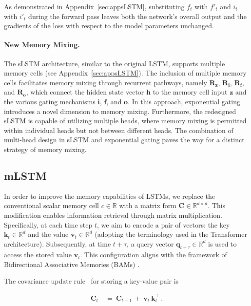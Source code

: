As demonstrated in Appendix~\ref{sec:appsLSTM}, substituting $f_t$ with $f'_t$ and $i_t$ with $i'_t$ during the forward pass leaves both the network’s overall output and the gradients of the loss with respect to the model parameters unchanged.

\paragraph{New Memory Mixing.} The sLSTM architecture, similar to the original LSTM, supports multiple memory cells (see Appendix~\ref{sec:appsLSTM}). The inclusion of multiple memory cells facilitates memory mixing through recurrent pathways, namely $\mathbf{R}_{\mathbf{z}}$, $\mathbf{R}_{\mathbf{i}}$, $\mathbf{R}_{\mathbf{f}}$, and $\mathbf{R}_{\mathbf{o}}$, which connect the hidden state vector $\mathbf{h}$ to the memory cell input $\mathbf{z}$ and the various gating mechanisms $\mathbf{i}$, $\mathbf{f}$, and $\mathbf{o}$. In this approach, exponential gating introduces a novel dimension to memory mixing. Furthermore, the redesigned sLSTM is capable of utilizing multiple heads, where memory mixing is permitted within individual heads but not between different heads. The combination of multi-head design in sLSTM and exponential gating paves the way for a distinct strategy of memory mixing.

\subsection{mLSTM}
\label{sec:mLSTM}

In order to improve the memory capabilities of LSTMs, we replace the conventional scalar memory cell $c \in \mathbb{R}$ with a matrix form $\mathbf{C} \in \mathbb{R}^{d \times d}$. This modification enables information retrieval through matrix multiplication. Specifically, at each time step $t$, we aim to encode a pair of vectors: the key $\mathbf{k}_t \in \mathbb{R}^d$ and the value $\mathbf{v}_t \in \mathbb{R}^d$ (adopting the terminology used in the Transformer architecture). Subsequently, at time $t + \tau$, a query vector $\mathbf{q}_{t+\tau} \in \mathbb{R}^d$ is used to access the stored value $\mathbf{v}_t$. This configuration aligns with the framework of Bidirectional Associative Memories (BAMs) \citep{Kohonen:72,Anderson:72,Nakano:72,Anderson:77}.

The covariance update rule~\citep{Sejnowski:77,Dayan:91} for storing a key-value pair is

\begin{align}
\mathbf{C}_t \ &= \ \mathbf{C}_{t-1} \ + \ \mathbf{v}_{t} \ \mathbf{k}_t^\top \ .
\end{align}

